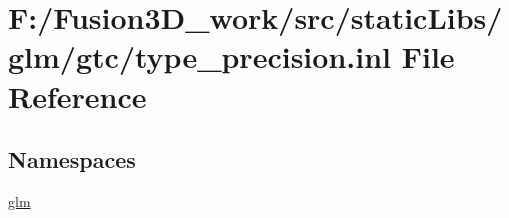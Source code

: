 \hypertarget{type__precision_8inl}{}\section{F\+:/\+Fusion3\+D\+\_\+work/src/static\+Libs/glm/gtc/type\+\_\+precision.inl File Reference}
\label{type__precision_8inl}
\subsection*{Namespaces}
\begin{DoxyCompactItemize}
\item 
 \hyperlink{namespaceglm}{glm}
\end{DoxyCompactItemize}
